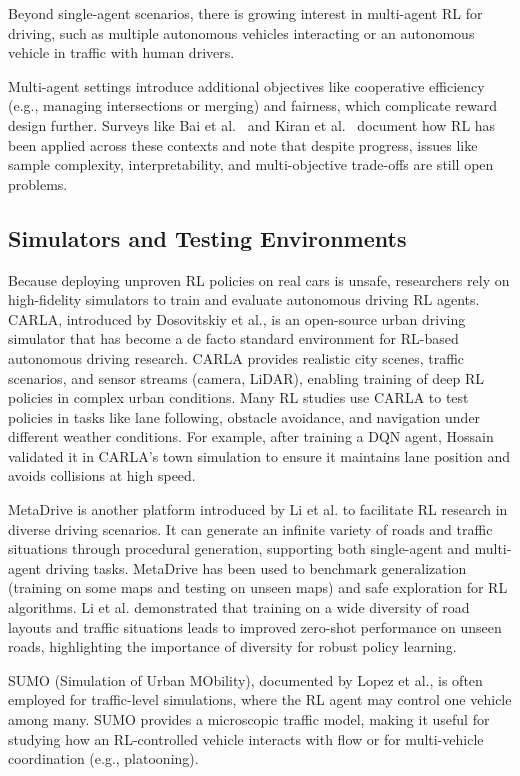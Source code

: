 \documentclass[12pt,a4paper]{article}
\begin{document}
Beyond single-agent scenarios, there is growing interest in multi-agent RL for driving, such as multiple autonomous vehicles interacting or an autonomous vehicle in traffic with human drivers.

Multi-agent settings introduce additional objectives like cooperative efficiency (e.g., managing intersections or merging) and fairness, which complicate reward design further. Surveys like Bai et al.~\cite{survey2023} and Kiran et al.~\cite{kiran2022} document how RL has been applied across these contexts and note that despite progress, issues like sample complexity, interpretability, and multi-objective trade-offs are still open problems.

\subsection{Simulators and Testing Environments}
Because deploying unproven RL policies on real cars is unsafe, researchers rely on high-fidelity simulators to train and evaluate autonomous driving RL agents. CARLA, introduced by Dosovitskiy et al.\cite{pmlr-v78-dosovitskiy17a}, is an open-source urban driving simulator that has become a de facto standard environment for RL-based autonomous driving research. CARLA provides realistic city scenes, traffic scenarios, and sensor streams (camera, LiDAR), enabling training of deep RL policies in complex urban conditions. Many RL studies use CARLA to test policies in tasks like lane following, obstacle avoidance, and navigation under different weather conditions. For example, after training a DQN agent, Hossain\cite{hossain2023} validated it in CARLA's town simulation to ensure it maintains lane position and avoids collisions at high speed.

MetaDrive is another platform introduced by Li et al.\cite{metadrive} to facilitate RL research in diverse driving scenarios. It can generate an infinite variety of roads and traffic situations through procedural generation, supporting both single-agent and multi-agent driving tasks. MetaDrive has been used to benchmark generalization (training on some maps and testing on unseen maps) and safe exploration for RL algorithms. Li et al. demonstrated that training on a wide diversity of road layouts and traffic situations leads to improved zero-shot performance on unseen roads, highlighting the importance of diversity for robust policy learning.

SUMO (Simulation of Urban MObility), documented by Lopez et al.\cite{lopez2018}, is often employed for traffic-level simulations, where the RL agent may control one vehicle among many. SUMO provides a microscopic traffic model, making it useful for studying how an RL-controlled vehicle interacts with flow or for multi-vehicle coordination (e.g., platooning).
\end{document}
